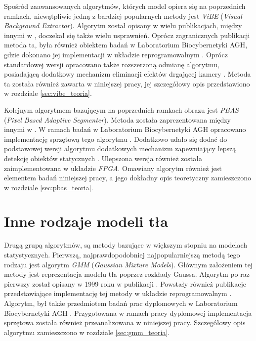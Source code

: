 Spośród zaawansowanych algorytmów, których model opiera się na poprzednich ramkach, niewątpliwie jedną z bardziej popularnych metody jest \textit{ViBE} (\textit{Visual Background Extractor}). Algorytm został opisany w wielu publikacjach, między innymi w \cite{barnich_11, droogenbroeck_12}, doczekał się także wielu usprawnień. Oprócz zagranicznych publikacji metoda ta, była również obiektem badań w Laboratorium Biocybernetyki AGH, gdzie dokonano jej implementacji w układzie reprogramowalnym \cite{kryjak_13_vibe}. Oprócz standardowej wersji opracowano także rozszerzoną odmianę algorytmu, posiadającą dodatkowy mechanizm eliminacji efektów drgającej kamery \cite{kryjak_14_vibe}. Metoda ta została również zawarta w niniejszej pracy, jej szczegółowy opis przedstawiono w rozdziale \ref{sec:vibe_teoria}.

Kolejnym algorytmem bazującym na poprzednich ramkach obrazu jest \textit{PBAS} (\textit{Pixel Based Adaptive Segmenter}). Metoda została zaprezentowana między innymi w \cite{hofmann_12}. W ramach badań w Laboratorium Biocybernetyki AGH opracowano implementację sprzętową tego algorytmu \cite{kryjak_13_pbas}. Dodatkowo udało się dodać do podstawowej wersji algorytmu dodatkowych mechanizm zapewniający lepszą detekcję obiektów statycznych \cite{kryjak_14_pbas}. Ulepszona wersja również została zaimplementowana w układzie \textit{FPGA}. Omawiany algorytm również jest elementem badań niniejszej pracy, a jego dokładny opis teoretyczny zamieszczono w rozdziale \ref{sec:pbas_teoria}.

\section{Inne rodzaje modeli tła}
\label{sec:model_inne}

Drugą grupą algorytmów, są metody bazujące w większym stopniu na modelach statystycznych. Pierwszą, najprawdopodobniej najpopularniejszą metodą tego rodzaju jest algorytm \textit{GMM} (\textit{Gaussian Mixture Models}). Głównym założeniem tej metody jest reprezentacja modelu tła poprzez rozkłady Gaussa. Algorytm po raz pierwszy został opisany w 1999 roku w publikacji \cite{Stauffer_Grimson_99}. Powstały również publikacje przedstawiające implementację tej metody w układzie reprogramowalnym \cite{Genovese_Napoli_13}. Algorytm, był także przedmiotem badań prac dyplomowych w Laboratorium Biocybernetyki AGH \cite{piszczek_15, janus_15}. Przygotowana w ramach pracy dyplomowej \cite{piszczek_15} implementacja sprzętowa została również przeanalizowana w niniejszej pracy. Szczegółowy opis algorytmu zamieszczono w rozdziale \ref{sec:gmm_teoria}.

